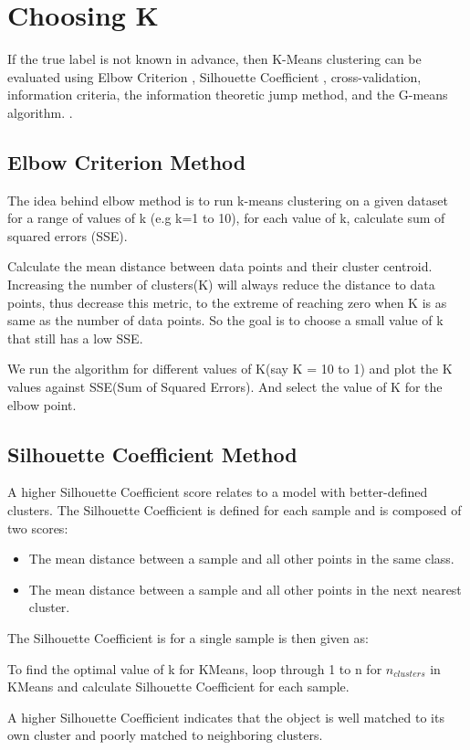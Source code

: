 \section{Choosing K}
    If the true label is not known in advance, then K-Means clustering can be evaluated using Elbow Criterion , Silhouette Coefficient , cross-validation, information criteria, the information theoretic jump method, and the G-means algorithm. .
    
    \subsection{Elbow Criterion Method}

        The idea behind elbow method is to run k-means clustering on a given dataset for a range of values of k (e.g k=1 to 10), for each value of k, calculate sum of squared errors (SSE).

        Calculate the mean distance between data points and their cluster centroid. Increasing the number of clusters(K) will always reduce the distance to data points, thus decrease this metric, to the extreme of reaching zero when K is as same as the number of data points. So the goal is to choose a small value of k that still has a low SSE.

        We run the algorithm for different values of K(say K = 10 to 1) and plot the K values against SSE(Sum of Squared Errors). And select the value of K for the elbow point.

    \subsection{Silhouette Coefficient Method}

        A higher Silhouette Coefficient score relates to a model with better-defined clusters. The Silhouette Coefficient is defined for each sample and is composed of two scores:
        \begin{itemize}
            \item The mean distance between a sample and all other points in the same class.
            \item The mean distance between a sample and all other points in the next nearest cluster.
        \end{itemize}
        The Silhouette Coefficient is for a single sample is then given as:



        To find the optimal value of k for KMeans, loop through 1 to n for $n_{clusters}$ in KMeans and calculate Silhouette Coefficient for each sample.

        A higher Silhouette Coefficient indicates that the object is well matched to its own cluster and poorly matched to neighboring clusters.
